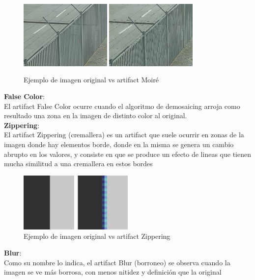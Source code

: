 \begin{figure}[htb]
\begin{center}
       \includegraphics[width=0.4\textwidth]{imagenes/moire_original.jpg}
          \hfill
           \includegraphics[width=0.4\textwidth]{imagenes/moire_example.jpg}
          
       Ejemplo de imagen original vs artifact Moiré
       \end{center}

\end{figure}

\textbf{False Color}:\\
El artifact False Color ocurre cuando el algoritmo de demosaicing arroja como resultado una zona en la imagen de distinto color al original.
\\
\textbf{Zippering}:\\
El artifact Zippering (cremallera) es un artifact que suele ocurrir en zonas de la imagen donde hay elementos borde, donde en la misma se genera un cambio abrupto en los valores, y consiste en que se produce un efecto de lineas que tienen mucha similitud a una cremallera en estos bordes
\\
\begin{figure}[htb]
\begin{center}
       \includegraphics[width=0.5\textwidth]{imagenes/zippering_example.jpeg}
       \caption{Ejemplo de imagen original vs artifact Zippering}
       \end{center}

\end{figure}
\textbf{Blur}:\\
Como su nombre lo indica, el artifact Blur (borroneo) se observa cuando la imagen se ve más borrosa, con menos nitidez y definición que la original\\

